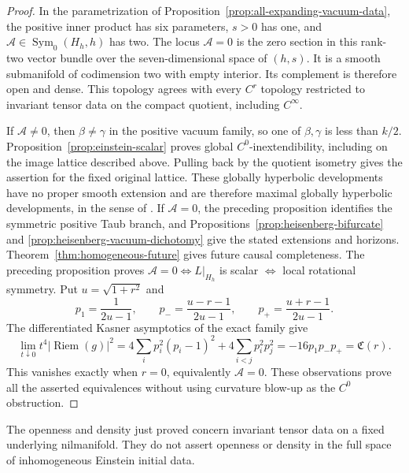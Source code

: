 \documentclass[10pt,a4paper]{article}
\numberwithin{equation}{section}
\theoremstyle{definition}
\theoremstyle{remark}
\begin{document}
\begin{proof}
In the parametrization of
Proposition~\ref{prop:all-expanding-vacuum-data}, the positive inner
product has six parameters, $s>0$ has one, and
$\mathcal A\in\operatorname{Sym}_0(H_h,h)$ has two.
The locus $\mathcal A=0$ is the zero section in this rank-two
vector bundle over the seven-dimensional space of $(h,s)$.
It is a smooth submanifold of codimension two with empty interior.
Its complement is therefore open and dense.
This topology agrees with every $C^r$ topology restricted to
invariant tensor data on the compact quotient, including $C^\infty$.

If $\mathcal A\ne0$, then $\beta\ne\gamma$ in the positive
vacuum family, so one of $\beta,\gamma$ is less than $k/2$.
Proposition~\ref{prop:einstein-scalar} proves global
$C^0$-inextendibility, including on the image lattice described
above.  Pulling back by the quotient isometry gives the assertion
for the fixed original lattice.  These globally hyperbolic
developments have no proper smooth extension and are therefore maximal
globally hyperbolic developments, in the sense of
\cite{ChoquetBruhatGeroch1969}.
If $\mathcal A=0$, the preceding proposition identifies the
symmetric positive Taub branch, and
Propositions~\ref{prop:heisenberg-bifurcate} and
\ref{prop:heisenberg-vacuum-dichotomy} give the stated extensions and horizons.
Theorem~\ref{thm:homogeneous-future} gives future causal completeness.
The preceding proposition proves
$\mathcal A=0\Longleftrightarrow L|_{H_h}$ is scalar
$\Longleftrightarrow$ local rotational symmetry.  Put
$u=\sqrt{1+r^2}$ and
\[
 p_1=\frac1{2u-1},\qquad
 p_-=\frac{u-r-1}{2u-1},\qquad
 p_+=\frac{u+r-1}{2u-1}.
\]
The differentiated Kasner asymptotics of the exact family give
\[
 \lim_{t\downarrow0}t^4|\operatorname{Riem}(g)|^2
 =4\sum_i p_i^2(p_i-1)^2+4\sum_{i<j}p_i^2p_j^2
 =-16p_1p_-p_+=\mathfrak C(r).
\]
This vanishes exactly when $r=0$, equivalently $\mathcal A=0$.
These observations prove all the asserted equivalences without using
curvature blow-up as the $C^0$ obstruction.
\end{proof}

The openness and density just proved concern invariant tensor data
on a fixed underlying nilmanifold.  They do not assert openness or
density in the full space of inhomogeneous Einstein initial data.
\end{document}
